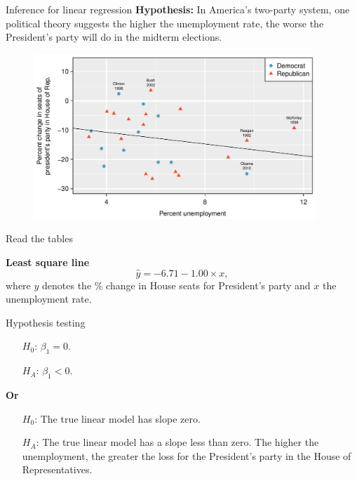 \documentclass[12pt,a4paper]{beamer}
\begin{document}
			\begin{frame}{Inference for linear regression}
				\textbf{Hypothesis:}  In America's two-party system, one political theory suggests the higher the unemployment rate, the worse the President's party will do in the midterm elections.
				\begin{figure}
				\centering
				\includegraphics[width=0.95\textwidth]{figures/unemploymentAndChangeInHouse/unemploymentAndChangeInHouse}
			\end{figure}
			\end{frame}
			\begin{frame}{Read the tables}
				
			\textbf{Least square line}
				\[\hat{y} =-6.71 - 1.00 \times x,\]
			\small	where $y$ denotes the \% change in House seats for President's party and $x$ the unemployment rate.
			\end{frame}
			\begin{frame}{Hypothesis testing}
				\begin{itemize}
				\item[$H_0$:] $\beta_1 = 0$. 
				\item[$H_A$:] $\beta_1 < 0$. 
				\end{itemize}
				\textbf{Or}
				\begin{itemize}
				\item[$H_0$:] The true linear model has slope zero.
				\item[$H_A$:]The true linear model has a slope less than zero. The higher the unemployment, the greater the loss for the President's party in the House of Representatives.
				\end{itemize}
				\end{frame}
\end{document}

